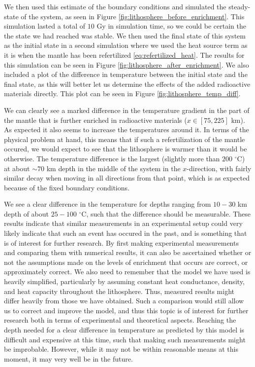 \documentclass[reprint,english,notitlepage]{revtex4-1}  %
\begin{document}
We then used this estimate of the boundary conditions and simulated the steady-state of the system, as seen in Figure \ref{fig:lithosphere_before_enrichment}. This simulation lasted a total of $10$ Gy in simulation time, so we could be certain the the state we had reached was stable. We then used the final state of this system as the initial state in a second simulation where we used the heat source term as it is when the mantle has been refertilized \eqref{eq:refertilized_heat}. The results for this simulation can be seen in Figure \ref{fig:lithosphere_after_enrichment}. We also included a plot of the difference in temperature between the initial state and the final state, as this will better let us determine the effects of the added radioactive materials directly. This plot can be seen in Figure \ref{fig:lithosphere_temp_diff}. 

We can clearly see a marked difference in the temperature gradient in the part of the mantle that is further enriched in radioactive materials ($x \in [75,225]$ km). As expected it also seems to increase the temperatures around it. In terms of the physical problem at hand, this means that if such a refertilization of the mantle occured, we would expect to see that the lithosphere is warmer than it would be otherwise. The temperature difference is the largest (slightly more than $200$ $^\circ$C) at about $\sim 70$ km depth in the middle of the system in the $x$-direction, with fairly similar decay when moving in all directions from that point, which is as expected because of the fixed boundary conditions. 

We see a clear difference in the temperature for depths ranging from $10-30$ km depth of about $25-100$ $^\circ$C, such that the difference should be measurable. These results indicate that similar measurements in an experimental setup could very likely indicate that such an event has occured in the past, and is something that is of interest for further research. By first making experimental measurements and comparing them with numerical results, it can also be ascertained whether or not the assumptions made on the levels of enrichment that occurs are correct, or approximately correct. We also need to remember that the model we have used is heavily simplified, particularly by assuming constant heat conductance, density, and heat capacity throughout the lithosphere. Thus, measured results might differ heavily from those we have obtained. Such a comparison would still allow us to correct and improve the model, and thus this topic is of interest for further research both in terms of experimental and theoretical aspects. Reaching the depth needed for a clear difference in temperature as predicted by this model is difficult and expensive at this time, such that making such measurements might be improbable. However, while it may not be within reasonable means at this moment, it may very well be in the future.
\end{document}
